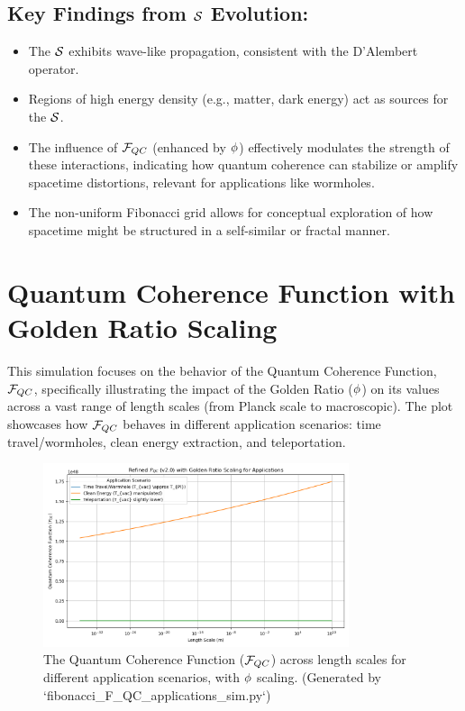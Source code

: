 \subsection*{Key Findings from $\mathcal{S}$ Evolution:}
\begin{itemize}[noitemsep]
    \item The $\mathcal{S}$ exhibits wave-like propagation, consistent with the D'Alembert operator.
    \item Regions of high energy density (e.g., matter, dark energy) act as sources for the $\mathcal{S}$.
    \item The influence of $\mathcal{F}_{QC}$ (enhanced by $\phi$) effectively modulates the strength of these interactions, indicating how quantum coherence can stabilize or amplify spacetime distortions, relevant for applications like wormholes.
    \item The non-uniform Fibonacci grid allows for conceptual exploration of how spacetime might be structured in a self-similar or fractal manner.
\end{itemize}

\section{Quantum Coherence Function with Golden Ratio Scaling}
This simulation focuses on the behavior of the Quantum Coherence Function, $\mathcal{F}_{QC}$, specifically illustrating the impact of the Golden Ratio ($\phi$) on its values across a vast range of length scales (from Planck scale to macroscopic). The plot showcases how $\mathcal{F}_{QC}$ behaves in different application scenarios: time travel/wormholes, clean energy extraction, and teleportation.

\begin{figure}[h!]
    \centering
    \includegraphics[width=0.8\textwidth]{figures/fibonacci_F_QC_applications_v2.png} %
    \caption{The Quantum Coherence Function ($\mathcal{F}_{QC}$) across length scales for different application scenarios, with $\phi$ scaling. (Generated by `fibonacci_F_QC_applications_sim.py`)}
    \label{fig:fibonacci_fqc_applications}
\end{figure}

